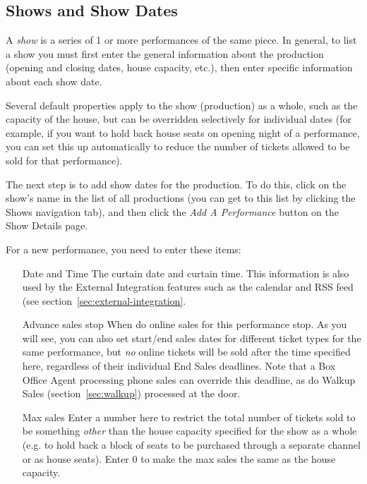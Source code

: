 \subsection{Shows and Show Dates}
\label{sec:shows-and-showdates}

A \emph{show} is a series of 1 or more performances of the same piece.
In general, to list a show you must first enter the general information
about the production (opening and closing dates, house capacity, etc.),
then enter specific information about each show date.

Several default properties apply to the show (production) as a whole,
such as the capacity of the house, but can be overridden selectively for
individual dates (for example, if you want to hold back house seats on
opening night of a performance, you can set this up automatically to
reduce the number of tickets allowed to be sold for that performance).

\label{sec:addingshows}
\label{sec:addingshowdates}

The next step is to add show dates for the production.  To do this,
click on the show's name in the list of all productions (you can get to
this list by clicking the Shows navigation tab), and then click
the \emph{Add A Performance} button on the Show Details page.

For a new performance, you need to enter these items:
\begin{enumerate}
\item[Date and Time] The curtain date and curtain time.  This
  information is also used by the External Integration features such as
  the calendar and RSS feed (see section~\ref{sec:external-integration}.
\item[Advance sales stop] When do online sales for this performance
  stop.  As you will see, you can also set start/end sales dates for
  different ticket types for the same performance, but \emph{no} online
  tickets will be sold after the time specified here, regardless of
  their individual End Sales deadlines.  Note that a Box Office Agent
  processing phone sales can override this deadline, as do Walkup
  Sales (section~\ref{sec:walkup}) processed at the door.
\item[Max sales] Enter a number here to restrict the total number of
  tickets sold to be something \emph{other} than the house capacity
  specified for the show as a whole (e.g. to hold back a block of seats
  to be purchased through a separate channel or as house seats).  Enter
  0 to make the max sales the same as the house capacity.
\end{enumerate}

